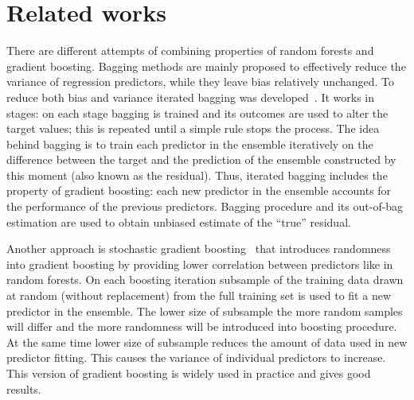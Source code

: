 \section{Related works}
There are different attempts of combining properties of random forests and gradient boosting.
Bagging methods are mainly proposed to effectively reduce the variance of regression predictors, while they leave bias relatively unchanged. 
To reduce both bias and variance iterated bagging was developed~\cite{key-iterated-bagging}. 
It works in stages: on each stage bagging is trained and its outcomes are used to alter the target values; this is repeated until a simple rule stops the process. 
The idea behind bagging is to train each predictor in the ensemble iteratively on the difference between the target and the prediction of the ensemble constructed by this moment (also known as the residual).
Thus, iterated bagging includes the property of gradient boosting: each new predictor in the ensemble accounts for the performance of the previous predictors.
Bagging procedure and its out-of-bag estimation are used to obtain unbiased estimate of the “true” residual. 

Another approach is stochastic gradient boosting~\cite{key-sgb} that introduces randomness into gradient boosting by providing lower correlation between predictors like in random forests. 
On each boosting iteration subsample of the training data drawn at random (without replacement) from the full training set is used to fit a new predictor in the ensemble. 
The lower size of subsample the more random samples will differ and the more randomness will be introduced into boosting procedure.
At the same time lower size of subsample reduces the amount of data used in new predictor fitting.
This causes the variance of individual predictors to increase.
This version of gradient boosting is widely used in practice and gives good results.


